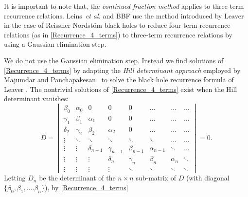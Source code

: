 \documentclass[aps,prd,longbibliography,reprint,twocolumn,amsmath,amssymb,amsfonts,showpacs,footnote,superscriptaddress]{revtex4-1}%
\begin{document}
It is important to note that, the \textit{continued fraction method} applies to three-term recurrence relations. Leins~\emph{et al.} and BBF use the method introduced by Leaver in
the case of Reissner-Nordst\"om black holes \cite{Leaver:1990zz} to reduce four-term recurrence relations (as in \eqref{Recurrence_4_terms}) to three-term recurrence relations by using a Gaussian elimination step.

We do not use the Gaussian elimination step. Instead we find solutions of \eqref{Recurrence_4_terms} by adapting the \textit{Hill determinant approach} employed by Majumdar and Panchapakesan~\cite{mp} to solve the black hole recurrence formula of Leaver \cite{Leaver:1985ax}. The nontrivial solutions of \eqref{Recurrence_4_terms} exist when the Hill determinant vanishes:
\begin{equation}
\label{Determinant_Hill_4_termes}
D   =  \begin{vmatrix}
   \beta_0         &  \alpha_0    &        0             &       0                    &          0                &     \ldots          &     \ldots        &    \ldots \\
   \gamma_1        &  \beta_1      &     \alpha_1     &       0                    &          0                &     \ldots          &     \ldots        &    \ldots  \\
    \delta_2       &   \gamma_2     &    \beta_2       &   \alpha_2             &         0                &     \ldots           &    \ldots         &    \ldots  \\
    \vdots         &      \ddots     &     \ddots       &    \ddots                &       \ddots          &     \ddots           &   \ldots          &    \ldots \\
     \vdots        &     \vdots      &     \delta_{n-1}      &    \gamma_{n-1}      &     \beta_{n-1}     &      \alpha_{n-1} &    \ddots         &    \ldots  \\
     \vdots        &  \vdots        &     \vdots        &     \delta_n                &    \gamma_{n}    &     \beta_{n}        &     \alpha_{n}  &    \ddots     \\
     \vdots        &  \vdots        &     \vdots        &     \vdots                &    \ddots            &     \ddots            &     \ddots       &    \ddots
                        \end{vmatrix}
       = 0.
\end{equation}
%
Letting $D_n$ be the determinant of the $n \times n$ sub-matrix of $D$ (with diagonal $\{\beta_0,\beta_1,....\beta_n\}$), by \eqref{Recurrence_4_terms}
\end{document}
